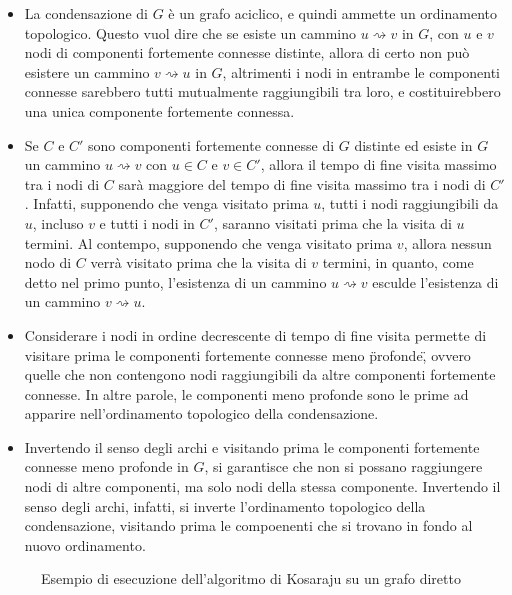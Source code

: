 \begin{itemize}
    \item La condensazione di $G$ \`e un grafo aciclico, e quindi ammette un ordinamento topologico.
        Questo vuol dire che se esiste un cammino $u \rightsquigarrow v$ in $G$, con $u$ e $v$ nodi di componenti
        fortemente connesse distinte, allora di certo non pu\`o esistere un cammino $v \rightsquigarrow u$ in $G$,
        altrimenti i nodi in entrambe le componenti connesse sarebbero tutti mutualmente raggiungibili tra loro, e
        costituirebbero una unica componente fortemente connessa.
    \item Se $C$ e $C'$ sono componenti fortemente connesse di $G$ distinte ed esiste in $G$ un cammino
        $u \rightsquigarrow v$ con $u \in C$ e $v \in C'$, allora il tempo di fine visita massimo tra i nodi di $C$
        sar\`a maggiore del tempo di fine visita massimo tra i nodi di $C'$.
        Infatti, supponendo che venga visitato prima $u$, tutti i nodi raggiungibili da $u$, incluso $v$ e tutti i nodi
        in $C'$, saranno visitati prima che la visita di $u$ termini.
        Al contempo, supponendo che venga visitato prima $v$, allora nessun nodo di $C$ verr\`a visitato prima che
        la visita di $v$ termini, in quanto, come detto nel primo punto, l'esistenza di un cammino
        $u \rightsquigarrow v$ esculde l'esistenza di un cammino $v \rightsquigarrow u$.
    \item Considerare i nodi in ordine decrescente di tempo di fine visita permette di visitare prima le componenti
        fortemente connesse meno \"profonde\", ovvero quelle che non contengono nodi raggiungibili da altre
        componenti fortemente connesse.
        In altre parole, le componenti meno profonde sono le prime ad apparire nell'ordinamento topologico della
        condensazione.
    \item Invertendo il senso degli archi e visitando prima le componenti fortemente connesse meno profonde in $G$, si
        garantisce che non si possano raggiungere nodi di altre componenti, ma solo nodi della stessa componente.
        Invertendo il senso degli archi, infatti, si inverte l'ordinamento topologico della condensazione, visitando
        prima le compoenenti che si trovano in fondo al nuovo ordinamento.
\end{itemize}

\begin{figure}
    \resizebox{!}{4cm}{
        }
    \resizebox{!}{4cm}{
        }
    \caption{Esempio di esecuzione dell'algoritmo di Kosaraju su un grafo diretto}
    \label{fig:kozaraju_example}
\end{figure}

